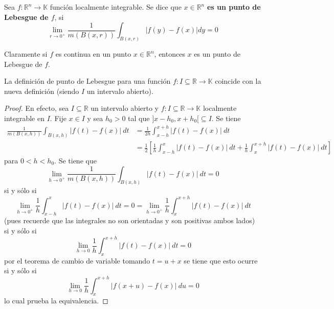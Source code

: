 \documentclass[12pt]{report}
\theoremstyle{largebreak}
\newcommand\abs[1]{\ensuremath{\left|#1\right|}}
\newcommand\cf[3]{\ensuremath{#1:#2\rightarrow#3}}
\begin{document}
    \begin{mydef}
        Sea $\cf{f}{\mathbb{R}^n}{\mathbb{K}}$ función localmente integrable. Se dice que $x\in\mathbb{R}^n$ \textbf{es un punto de Lebesgue de $f$}, si
        \begin{equation*}
            \lim_{r\rightarrow0^+} \frac{1}{m(B(x,r))}\int_{B(x,r)}\abs{f(y)-f(x)}dy=0
        \end{equation*}
    \end{mydef}

    \begin{obs}
        Claramente si $f$ es continua en un punto $x\in\mathbb{R}^n$, entonces $x$ es un punto de Lebesgue de $f$.
    \end{obs}

    \begin{obs}
        La definición de punto de Lebesgue para una función $\cf{f}{I\subseteq\mathbb{R}}{\mathbb{K}}$ coincide con la nueva definición (siendo $I$ un intervalo abierto).
    \end{obs}

    \begin{proof}
        En efecto, sea $I\subseteq\mathbb{R}$ un intervalo abierto y $\cf{f}{I\subseteq\mathbb{R}}{\mathbb{K}}$ localmente integrable en $I$. Fije $x\in I$ y sea $h_0>0$ tal que
        $]x-h_0,x+h_0[\subseteq I$. Se tiene
        \begin{equation*}
            \begin{split}
                \frac{1}{m(B(x,h))}\int_{B(x,h)}\abs{f(t)-f(x)}\:dt&=\frac{1}{2h}\int_{ x-h}^{ x+h}\abs{f(t)-f(x)}\:dt\\
                &=\frac{1}{2}\left[\frac{1}{h}\int_{ x-h}^{x}\abs{f(t)-f(x)}\:dt+\frac{1}{h}\int_{ x}^{ x+h}\abs{f(t)-f(x)}\:dt \right]
            \end{split}
        \end{equation*}
        para $0<h<h_0$. Se tiene que
        \begin{equation*}
            \lim_{h\rightarrow0^+}\frac{1}{m(B(x,h))}\int_{B(x,h)}\abs{f(t)-f(x)}\:dt=0
        \end{equation*}
        si y sólo si
        \begin{equation*}
            \lim_{h\rightarrow0^+}\frac{1}{h}\int_{ x-h}^{x}\abs{f(t)-f(x)}\:dt=0=\lim_{h\rightarrow0^+}\frac{1}{h}\int_{ x}^{ x+h}\abs{f(t)-f(x)}\:dt
        \end{equation*}
        (pues recuerde que las integrales no son orientadas y son positivas ambos lados) si y sólo si
        \begin{equation*}
            \lim_{h\rightarrow0}\frac{1}{h}\int_{ x}^{ x+h}\abs{f(t)-f(x)}\:dt=0
        \end{equation*}
        por el teorema de cambio de variable tomando $t=u+x$ se tiene que esto ocurre si y sólo si
        \begin{equation*}
            \lim_{h\rightarrow0}\frac{1}{h}\int_{ x}^{ x+h}\abs{f(x+u)-f(x)}\:du=0
        \end{equation*}
        lo cual prueba la equivalencia.
    \end{proof}
\end{document}
